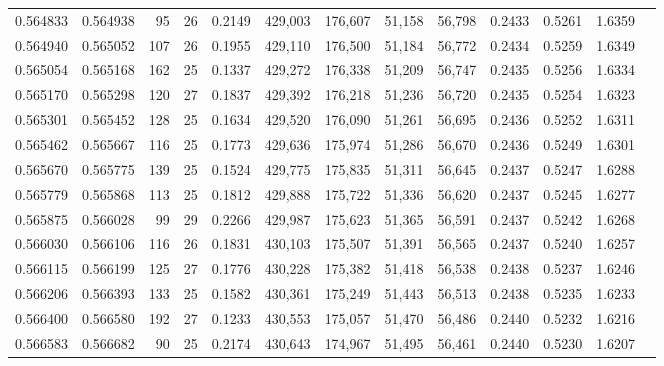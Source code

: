 \begin{tabular}{rrrrrrrrrrrrr}
0.564833 & 0.564938 &    95 &  26 &                                     0.2149 & 429,003 & 176,607 &  51,158 &  56,798 & 0.2433 & 0.5261 & 1.6359 \\
0.564940 & 0.565052 &   107 &  26 &                                     0.1955 & 429,110 & 176,500 &  51,184 &  56,772 & 0.2434 & 0.5259 & 1.6349 \\
0.565054 & 0.565168 &   162 &  25 &                                     0.1337 & 429,272 & 176,338 &  51,209 &  56,747 & 0.2435 & 0.5256 & 1.6334 \\
0.565170 & 0.565298 &   120 &  27 &                                     0.1837 & 429,392 & 176,218 &  51,236 &  56,720 & 0.2435 & 0.5254 & 1.6323 \\
0.565301 & 0.565452 &   128 &  25 &                                     0.1634 & 429,520 & 176,090 &  51,261 &  56,695 & 0.2436 & 0.5252 & 1.6311 \\
0.565462 & 0.565667 &   116 &  25 &                                     0.1773 & 429,636 & 175,974 &  51,286 &  56,670 & 0.2436 & 0.5249 & 1.6301 \\
0.565670 & 0.565775 &   139 &  25 &                                     0.1524 & 429,775 & 175,835 &  51,311 &  56,645 & 0.2437 & 0.5247 & 1.6288 \\
0.565779 & 0.565868 &   113 &  25 &                                     0.1812 & 429,888 & 175,722 &  51,336 &  56,620 & 0.2437 & 0.5245 & 1.6277 \\
0.565875 & 0.566028 &    99 &  29 &                                     0.2266 & 429,987 & 175,623 &  51,365 &  56,591 & 0.2437 & 0.5242 & 1.6268 \\
0.566030 & 0.566106 &   116 &  26 &                                     0.1831 & 430,103 & 175,507 &  51,391 &  56,565 & 0.2437 & 0.5240 & 1.6257 \\
0.566115 & 0.566199 &   125 &  27 &                                     0.1776 & 430,228 & 175,382 &  51,418 &  56,538 & 0.2438 & 0.5237 & 1.6246 \\
0.566206 & 0.566393 &   133 &  25 &                                     0.1582 & 430,361 & 175,249 &  51,443 &  56,513 & 0.2438 & 0.5235 & 1.6233 \\
0.566400 & 0.566580 &   192 &  27 &                                     0.1233 & 430,553 & 175,057 &  51,470 &  56,486 & 0.2440 & 0.5232 & 1.6216 \\
0.566583 & 0.566682 &    90 &  25 &                                     0.2174 & 430,643 & 174,967 &  51,495 &  56,461 & 0.2440 & 0.5230 & 1.6207 \\

\end{tabular}
